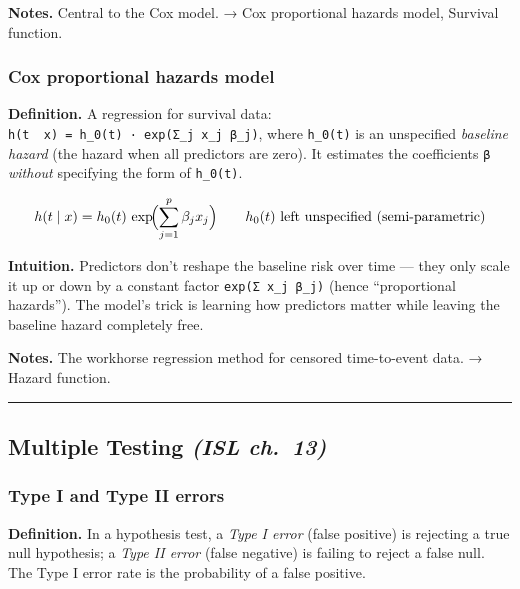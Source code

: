 \documentclass[
  10pt,
  letterpaper,
  onecolumn]{article}
\begin{document}
\textbf{Notes.} Central to the Cox model. → Cox proportional hazards
model, Survival function.

\hypertarget{cox-proportional-hazards-model}{%
\subsubsection{Cox proportional hazards
model}\label{cox-proportional-hazards-model}}

\textbf{Definition.} A regression for survival data:
\texttt{h(t\ \textbar{}\ x)\ =\ h\_0(t)\ ·\ exp(Σ\_j\ x\_j\ β\_j)},
where \texttt{h\_0(t)} is an unspecified \emph{baseline hazard} (the
hazard when all predictors are zero). It estimates the coefficients
\texttt{β} \emph{without} specifying the form of \texttt{h\_0(t)}.

\begin{equation*}
h(t\mid x)=h_0(t)\,\exp\!\Bigl(\sum_{j=1}^{p}\beta_jx_j\Bigr)
\qquad h_0(t)\text{ left unspecified (semi-parametric)}
\end{equation*}

\textbf{Intuition.} Predictors don't reshape the baseline risk over time
--- they only scale it up or down by a constant factor
\texttt{exp(Σ\ x\_j\ β\_j)} (hence ``proportional hazards''). The
model's trick is learning how predictors matter while leaving the
baseline hazard completely free.

\textbf{Notes.} The workhorse regression method for censored
time-to-event data. → Hazard function.

\begin{center}\rule{0.5\linewidth}{0.5pt}\end{center}

\hypertarget{multiple-testing-isl-ch.-13}{%
\subsection{\texorpdfstring{Multiple Testing \emph{(ISL
ch.~13)}}{Multiple Testing (ISL ch.~13)}}\label{multiple-testing-isl-ch.-13}}

\hypertarget{type-i-and-type-ii-errors}{%
\subsubsection{Type I and Type II
errors}\label{type-i-and-type-ii-errors}}

\textbf{Definition.} In a hypothesis test, a \emph{Type I error} (false
positive) is rejecting a true null hypothesis; a \emph{Type II error}
(false negative) is failing to reject a false null. The Type I error
rate is the probability of a false positive.
\end{document}
